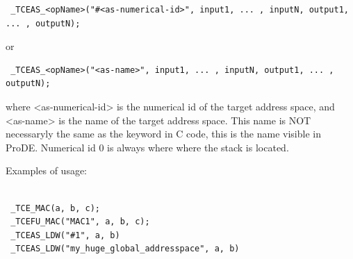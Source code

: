 \documentclass[a4paper,twoside]{tceusermanual}
\begin{document}
\begin{verbatim}
 _TCEAS_<opName>("#<as-numerical-id>", input1, ... , inputN, output1, ... , outputN);
\end{verbatim}

or

\begin{verbatim}
 _TCEAS_<opName>("<as-name>", input1, ... , inputN, output1, ... , outputN);
\end{verbatim}

where <as-numerical-id> is the numerical id  of the target address space, 
and <as-name> is the name of the target address space.
This name is NOT necessaryly the same as the keyword in C code,
this is the name visible in ProDE. Numerical id 0 is always where
where the stack is located.

Examples of usage:

\begin{verbatim}
 
 _TCE_MAC(a, b, c);
 _TCEFU_MAC("MAC1", a, b, c);
 _TCEAS_LDW("#1", a, b)
 _TCEAS_LDW("my_huge_global_addresspace", a, b)

\end{verbatim}


%

%
%
%
%
\end{document}
